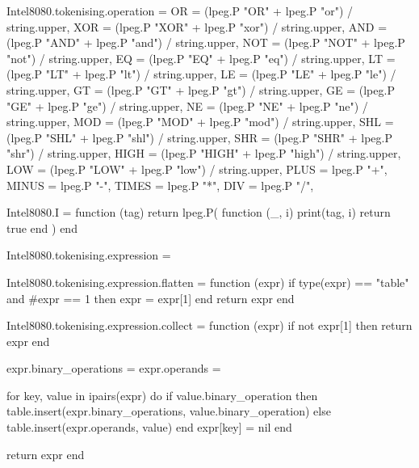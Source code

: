 Intel8080.tokenising.operation = {
    OR = (lpeg.P "OR" + lpeg.P "or") / string.upper,
    XOR = (lpeg.P "XOR" + lpeg.P "xor") / string.upper,
    AND = (lpeg.P "AND" + lpeg.P "and") / string.upper,
    NOT = (lpeg.P "NOT" + lpeg.P "not") / string.upper,
    EQ = (lpeg.P "EQ" + lpeg.P "eq") / string.upper,
    LT = (lpeg.P "LT" + lpeg.P "lt") / string.upper,
    LE = (lpeg.P "LE" + lpeg.P "le") / string.upper,
    GT = (lpeg.P "GT" + lpeg.P "gt") / string.upper,
    GE = (lpeg.P "GE" + lpeg.P "ge") / string.upper,
    NE = (lpeg.P "NE" + lpeg.P "ne") / string.upper,
    MOD = (lpeg.P "MOD" + lpeg.P "mod") / string.upper,
    SHL = (lpeg.P "SHL" + lpeg.P "shl") / string.upper,
    SHR = (lpeg.P "SHR" + lpeg.P "shr") / string.upper,
    HIGH = (lpeg.P "HIGH" + lpeg.P "high") / string.upper,
    LOW = (lpeg.P "LOW" + lpeg.P "low") / string.upper,
    PLUS = lpeg.P "+",
    MINUS = lpeg.P "-",
    TIMES = lpeg.P "*",
    DIV = lpeg.P "/",
}

Intel8080.I = function (tag)
    return lpeg.P(
        function (_, i)
            print(tag, i)
            return true
        end
    )
end

Intel8080.tokenising.expression = {}

Intel8080.tokenising.expression.flatten = function (expr)
    if type(expr) == "table" and #expr == 1 then
        expr = expr[1]
    end
    return expr
end

Intel8080.tokenising.expression.collect = function (expr)
    if not expr[1] then return expr end

    expr.binary_operations = {}
    expr.operands = {}

    for key, value in ipairs(expr) do
        if value.binary_operation then
            table.insert(expr.binary_operations, value.binary_operation)
        else
            table.insert(expr.operands, value)
        end
        expr[key] = nil
    end

    return expr
end

